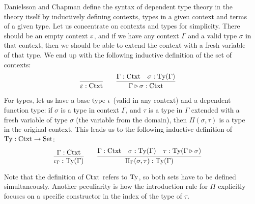 \documentclass{article}
\begin{document}
\begin{example}
\label{ex:ctxt-type}


Danielsson \cite{danielsson2007formalisation} and Chapman
\cite{chapman2009eatitself} define the syntax of dependent type theory
in the theory itself by inductively defining contexts, types in a
given context and terms of a given type. Let us concentrate on
contexts and types for simplicity. There should be an empty
context $\varepsilon$, and if we have any context $\Gamma$ and a valid
type $\sigma$ in that context, then we should be able to extend the
context with a fresh variable of that type. We end up with the
following inductive definition of the set of contexts:
\[
\infer{\emptyCtxt : \Ctxt}{} \qquad
\infer{\consCtxt{\Gamma}{\sigma} : \Ctxt}{\Gamma : \Ctxt & \sigma : \Ty(\Gamma)}
\]

For types, let us have a base type $\iota_{}$ (valid in any context)
and a dependent function type: if $\sigma$ is a type in context $\Gamma$,
and $\tau$ is a type in $\Gamma$ extended with a fresh variable of type
$\sigma$ (the variable from the domain), then $\Pi(\sigma, \tau)$ is a
type in the original context. This leads us to the following inductive
definition of $\text{Ty} : \text{Ctxt} \to \text{Set}$:
\[
\infer{\baseTy{\Gamma} : \Ty(\Gamma)}{\Gamma : \Ctxt} \qquad
\infer{\piTy{\Gamma}{\sigma}{\tau} : \Ty(\Gamma)}{\Gamma : \Ctxt
                    & \sigma : \Ty(\Gamma)
                    & \tau : \Ty(\consCtxt{\Gamma}{\sigma})}
\]

Note that the definition of $\text{Ctxt}$ refers to $\text{Ty}$, so both sets
have to be defined simultaneously. Another peculiarity is how the
introduction rule for $\Pi$ explicitly focuses on a specific
constructor in the index of the type of $\tau$.
\blackqed


\end{example}
\end{document}
